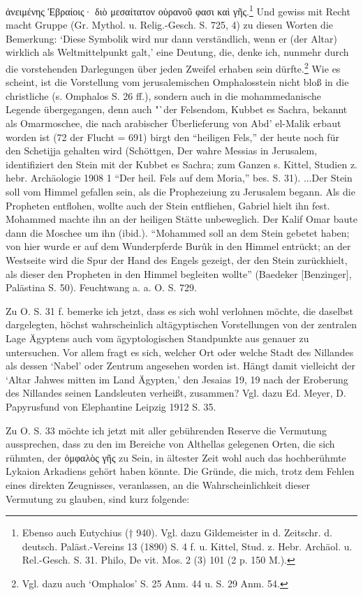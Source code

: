 \documentclass[a4paper, 11pt, oneside]{article}
\begin{document}
ἀνειμένης Ἑβραίοις· διὸ μεσαίτατον οὐρανοῦ φασι καὶ γῆς.\footnote{Ebenso auch Eutychius († 940). Vgl. dazu Gildemeister in d. Zeitschr. d. deutsch. Paläst.-Vereins 13 (1890) S. 4 f. u. Kittel, Stud. z. Hebr. Archäol. u. Rel.-Gesch. S. 31. Philo, De vit. Mos. 2 (3) 101 (2 p. 150 M.).} Und gewiss mit Recht macht Gruppe (Gr. Mythol. u. Relig.-Gesch. S. 725, 4) zu diesen Worten die Bemerkung: `Diese Symbolik wird nur dann verständlich, wenn er (der Altar) wirklich als Weltmittelpunkt galt,' eine Deutung, die, denke ich, nunmehr durch die vorstehenden Darlegungen über jeden Zweifel erhaben sein dürfte.\footnote{Vgl. dazu auch `Omphalos' S. 25 Anm. 44 u. S. 29 Anm. 54.} Wie es scheint, ist die Vorstellung vom jerusalemischen Omphalosstein nicht bloß in die christliche (s. Omphalos S. 26 ff.), sondern auch in die mohammedanische Legende übergegangen, denn auch "`der Felsendom, Kubbet es Sachra, bekannt als Omarmoschee, die nach arabischer Überlieferung von Abd' el-Malik erbaut worden ist (72 der Flucht = 691) birgt den "`heiligen Fels,"' der heute noch für den Schetijja gehalten wird (Schöttgen, Der wahre Messias in Jerusalem, identifiziert den Stein mit der Kubbet es Sachra; zum Ganzen s. Kittel, Studien z. hebr. Archäologie 1908 1 "`Der heil. Fels auf dem Moria,"' bes. S. 31). ...Der Stein soll vom Himmel gefallen sein, als die Prophezeiung zu Jerusalem begann. Als die Propheten entflohen, wollte auch der Stein entfliehen, Gabriel hielt ihn fest. Mohammed machte ihn an der heiligen Stätte unbeweglich. Der Kalif Omar baute dann die Moschee um ihn (ibid.). "`Mohammed soll an dem Stein gebetet haben; von hier wurde er auf dem Wunderpferde Burûk in den Himmel entrückt; an der Westseite wird die Spur der Hand des Engels gezeigt, der den Stein zurückhielt, als dieser den Propheten in den Himmel begleiten wollte"' (Baedeker [Benzinger], Palästina S. 50). Feuchtwang a. a. O. S. 729.

Zu O. S. 31 f. bemerke ich jetzt, dass es sich wohl verlohnen möchte, die daselbst dargelegten, höchst wahrscheinlich altägyptischen Vorstellungen von der zentralen Lage Ägyptens auch vom ägyptologischen Standpunkte aus genauer zu untersuchen. Vor allem fragt es sich, welcher Ort oder welche Stadt des Nillandes als dessen `Nabel' oder Zentrum angesehen worden ist. Hängt damit vielleicht der `Altar Jahwes mitten im Land Ägypten,' den Jesaias 19, 19 nach der Eroberung des Nillandes seinen Landsleuten verheißt, zusammen? Vgl. dazu Ed. Meyer, D. Papyrusfund von Elephantine Leipzig 1912 S. 35.

Zu O. S. 33 möchte ich jetzt mit aller gebührenden Reserve die Vermutung aussprechen, dass zu den im Bereiche von Althellas gelegenen Orten, die sich rühmten, der ὀμφαλὸς γῆς zu Sein, in ältester Zeit wohl auch das hochberühmte Lykaion Arkadiens gehört haben könnte. Die Gründe, die mich, trotz dem Fehlen eines direkten Zeugnisses, veranlassen, an die Wahrscheinlichkeit dieser Vermutung zu glauben, sind kurz folgende:
\end{document}
